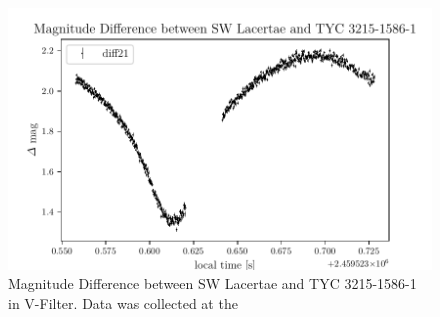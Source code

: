   \begin{figure}[H]
    \centering
    \includegraphics{V-Filter.pdf}
    \caption{Magnitude Difference between SW Lacertae and TYC 3215-1586-1 in V-Filter. Data 
    was collected at the }
    \label{fig:plot}
  \end{figure}

